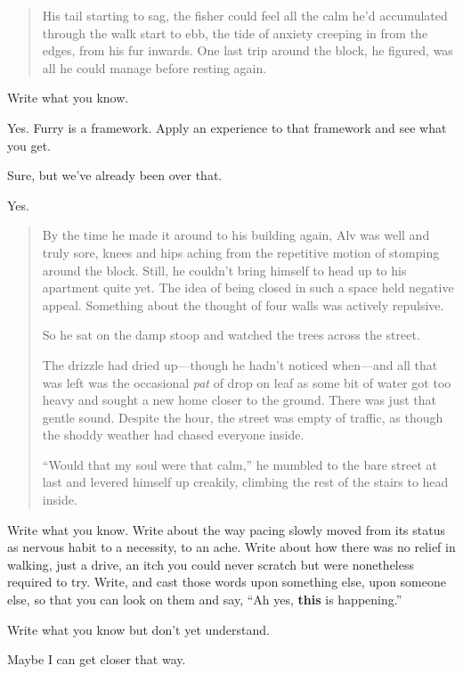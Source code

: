 \begin{paracol}{2}
\begin{leftcolumn}
\begin{quotation}
  His tail starting to sag, the fisher could feel all the calm he'd accumulated through the walk start to ebb, the tide of anxiety creeping in from the edges, from his fur inwards. One last trip around the block, he figured, was all he could manage before resting again.
\end{quotation}

\begin{ally}
Write what you know.
\end{ally}
Yes. Furry is a framework. Apply an experience to that framework and see what you get.

\begin{ally}
Sure, but we've already been over that.
\end{ally}
Yes.

\begin{quotation}
  \noindent By the time he made it around to his building again, Alv was well and truly sore, knees and hips aching from the repetitive motion of stomping around the block. Still, he couldn't bring himself to head up to his apartment quite yet. The idea of being closed in such a space held negative appeal. Something about the thought of four walls was actively repulsive.

  So he sat on the damp stoop and watched the trees across the street.

  The drizzle had dried up---though he hadn't noticed when---and all that was left was the occasional \emph{pat} of drop on leaf as some bit of water got too heavy and sought a new home closer to the ground. There was just that gentle sound. Despite the hour, the street was empty of traffic, as though the shoddy weather had chased everyone inside.

  ``Would that my soul were that calm,'' he mumbled to the bare street at last and levered himself up creakily, climbing the rest of the stairs to head inside.
\end{quotation}

\begin{ally}
Write what you know. Write about the way pacing slowly moved from its status as nervous habit to a necessity, to an ache. Write about how there was no relief in walking, just a drive, an itch you could never scratch but were nonetheless required to try. Write, and cast those words upon something else, upon someone else, so that you can look on them and say, ``Ah yes, \textbf{this} is happening.''
\end{ally}
\begin{ally}
Write what you know but don't yet understand.
\end{ally}
Maybe I can get closer that way.


\end{leftcolumn}
\end{paracol}
